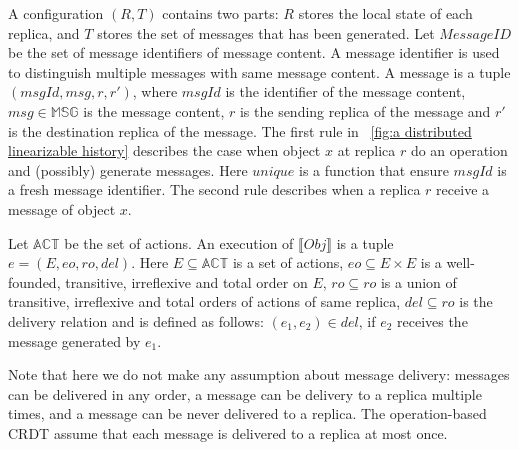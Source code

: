 A configuration $(R,T)$ contains two parts: $R$ stores the local state of each replica, and $T$ stores the set of messages that has been generated. Let $\mathit{MessageID}$ be the set of message identifiers of message content. A message identifier is used to distinguish multiple messages with same message content. A message is a tuple $(\mathit{msgId},\mathit{msg},r,r')$, where $\mathit{msgId}$ is the identifier of the message content, $\mathit{msg} \in \mathbb{MSG}$ is the message content, $r$ is the sending replica of the message and $r'$ is the destination replica of the message. The first rule in \figurename~\ref{fig:a distributed linearizable history} describes the case when object $x$ at replica $r$ do an operation and (possibly) generate messages. Here $\mathit{unique}$ is a function that ensure $\mathit{msgId}$ is a fresh message identifier. The second rule describes when a replica $r$ receive a message of object $x$.


Let $\mathbb{ACT}$ be the set of actions. An execution of $\llbracket \mathit{Obj} \rrbracket$ is a tuple $e = (E,\mathit{eo},\mathit{ro},\mathit{del})$. Here $E \subseteq \mathbb{ACT}$ is a set of actions, $\mathit{eo} \subseteq E \times E$ is a well-founded, transitive, irreflexive and total order on $E$, $\mathit{ro} \subseteq \mathit{ro}$ is a union of transitive, irreflexive and total orders of actions of same replica, $\mathit{del} \subseteq \mathit{ro}$ is the delivery relation and is defined as follows: $(e_1,e_2) \in \mathit{del}$, if $e_2$ receives the message generated by $e_1$. 

Note that here we do not make any assumption about message delivery: messages can be delivered in any order, a message can be delivery to a replica multiple times, and a message can be never delivered to a replica. The operation-based CRDT assume that each message is delivered to a replica at most once. 





